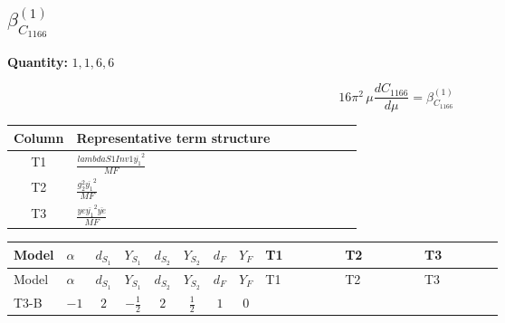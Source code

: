 \documentclass[8pt]{article}
\begin{document}
\begin{landscape}
\section*{$\beta_{C_{1166}}^{(1)}$}
\noindent\textbf{Quantity: }$\mathrm{1,1,6,6}$\par\smallskip
\[16\pi^2\,\mu\frac{d C_{1166}}{d\mu}=\beta_{C_{1166}}^{(1)}\]
\begin{center}
\begin{tabular}{@{}c >{\raggedright\arraybackslash}p{0.82\linewidth}@{}}
\toprule
Column & Representative term structure \\
\midrule
T1 & \(\displaystyle \frac{lambdaS1Inv1 \overline{y_{1}}^{2}}{MF}\) \\
\midrule
T2 & \(\displaystyle \frac{g_{2}^{2} \overline{y_{1}}^{2}}{MF}\) \\
\midrule
T3 & \(\displaystyle \frac{ye \overline{y_{1}}^{2} \overline{ye}}{MF}\) \\
\midrule
\bottomrule
\end{tabular}
\end{center}
\smallskip
\tiny
\begin{longtable}{@{}llcccccc >{\raggedright\arraybackslash}p{0.21\linewidth} >{\raggedright\arraybackslash}p{0.21\linewidth} >{\raggedright\arraybackslash}p{0.21\linewidth}@{}}
\toprule
Model & $\alpha$ & $d_{S_1}$ & $Y_{S_1}$ & $d_{S_2}$ & $Y_{S_2}$ & $d_F$ & $Y_F$ & T1 & T2 & T3 \\
\midrule
\endfirsthead
\toprule
Model & $\alpha$ & $d_{S_1}$ & $Y_{S_1}$ & $d_{S_2}$ & $Y_{S_2}$ & $d_F$ & $Y_F$ & T1 & T2 & T3 \\
\midrule
\endhead
T3-B & $-1$ & $2$ & $-\frac{1}{2}$ & $2$ & $\frac{1}{2}$ & $1$ & $0$ & \scriptsize\adjustbox{max width=\linewidth}{$\begin{gathered} \frac{lambdaS1Inv1 \overline{y_{1}}^{2}}{2 MF}\end{gathered}$} & \scriptsize\adjustbox{max width=\linewidth}{$\begin{gathered} \frac{3 g_{2}^{2} \overline{y_{1}}^{2}}{4 MF}\end{gathered}$} & \scriptsize\adjustbox{max width=\linewidth}{$\begin{gathered} - \frac{ye \overline{y_{1}}^{2} \overline{ye}}{4 MF}\end{gathered}$} \\
\midrule
\bottomrule
\end{longtable}
\clearpage

\end{landscape}
\end{document}
